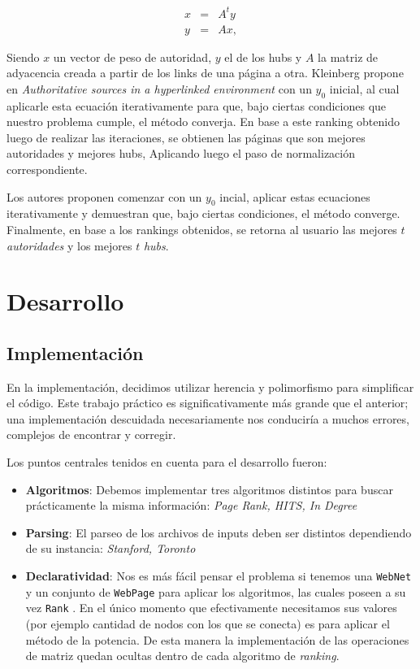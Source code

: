 \begin{eqnarray}
x & = & A^ty \label{eq:auth-update-math} \\
y & = & Ax, \label{eq:hub-update-math} 
\end{eqnarray}

Siendo $x$ un vector de peso de autoridad, $y$ el de los hubs y $A$ la matriz de adyacencia creada a partir de los links de una página a otra.
Kleinberg propone en \textit{Authoritative sources in a hyperlinked environment} con un $y_0$ inicial, al cual aplicarle esta ecuación iterativamente para que, bajo ciertas condiciones que nuestro problema cumple, el método converja. En base a este ranking obtenido luego de realizar las iteraciones, se obtienen las páginas que son mejores autoridades y mejores hubs, Aplicando luego el paso de normalizaci\'on correspondiente. 

Los autores proponen comenzar con un $y_0$ incial, aplicar estas ecuaciones 
iterativamente y demuestran que, bajo ciertas condiciones, el m\'etodo converge. Finalmente, en base a los rankings obtenidos, se retorna
al usuario las mejores $t$ \emph{autoridades} y los mejores $t$ \emph{hubs}.


\section{Desarrollo}

\subsection{Implementación}

	En la implementación, decidimos utilizar herencia y polimorfismo para simplificar el código. Este trabajo práctico es significativamente más grande que el anterior; una implementación descuidada necesariamente nos conduciría a muchos errores, complejos de encontrar y corregir. 

	Los puntos centrales tenidos en cuenta para el desarrollo fueron:

	\begin{itemize}
		\item \textbf{Algoritmos}: Debemos implementar tres algoritmos distintos para buscar prácticamente la misma información: \textit{Page Rank, HITS, In Degree}
		\item \textbf{Parsing}: El parseo de los archivos de inputs deben ser distintos dependiendo de su instancia: \textit{Stanford, Toronto}
		\item \textbf{Declaratividad}: Nos es más fácil pensar el problema si tenemos una \texttt{WebNet} y un conjunto de \texttt{WebPage} para aplicar los algoritmos, las cuales poseen a su vez \texttt{Rank} . En el único momento que efectivamente necesitamos sus valores (por ejemplo cantidad de nodos con los que se conecta) es para aplicar el método de la potencia. De esta manera la implementación de las operaciones de matriz quedan ocultas dentro de cada algoritmo de \textit{ranking}.
	\end{itemize}

